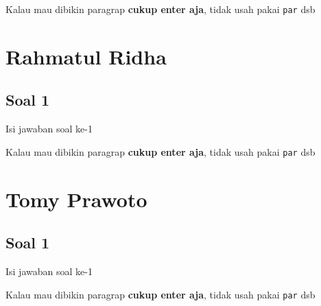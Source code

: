 Kalau mau dibikin paragrap \textbf{cukup enter aja}, tidak usah pakai \verb|par| dsb



\section{Rahmatul Ridha}
\subsection{Soal 1}
Isi jawaban soal ke-1

Kalau mau dibikin paragrap \textbf{cukup enter aja}, tidak usah pakai \verb|par| dsb



\section{Tomy Prawoto}
\subsection{Soal 1}
Isi jawaban soal ke-1

Kalau mau dibikin paragrap \textbf{cukup enter aja}, tidak usah pakai \verb|par| dsb


